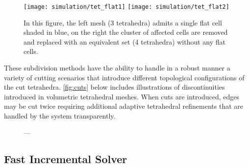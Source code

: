 \begin{figure}
  \centering%
  \texttt{[image: simulation/tet\_flat1]}\label{fig:tet_flat1}
  \hspace{10ex}
  \texttt{[image: simulation/tet\_flat2]}\label{fig:tet_flat2}
  \caption{In this figure, the left mesh (3 tetrahedra) admits a single flat cell shaded in blue, on the right the cluster of affected cells are removed and replaced with an equivalent set (4 tetrahedra) without any flat cells.}\label{fig:flat_tet}
\end{figure}



These subdivision methods have the ability to handle in a robust manner a variety of cutting scenarios that introduce different topological configurations of the cut tetrahedra. \autoref{fig:cuts} below includes illustrations of discontinuities introduced in volumetric tetrahedral meshes.  When cuts are introduced, edges may be cut twice requiring additional adaptive tetrahedral refinements that are handled by the system transparently.

\begin{figure}
  \centering%
  \setlength{\fboxsep}{0pt}%
  \setlength{\fboxrule}{0.1pt}%
  \hfill%
  \hfill%
  \caption{---}\label{fig:cuts}
\end{figure}


\subsection{Fast Incremental Solver}\label{ssec:incremental_solver}


